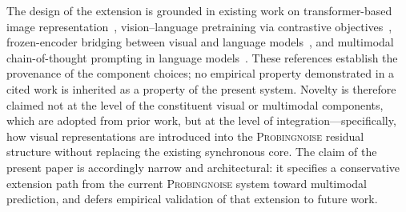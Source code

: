 The design of the extension is grounded in existing work on transformer-based image representation~\citep{dosovitskiy2021vit}, vision--language pretraining via contrastive objectives~\citep{radford2021clip}, frozen-encoder bridging between visual and language models~\citep{li2023blip2}, and multimodal chain-of-thought prompting in language models~\citep{zhang2023mcot}. These references establish the provenance of the component choices; no empirical property demonstrated in a cited work is inherited as a property of the present system. Novelty is therefore claimed not at the level of the constituent visual or multimodal components, which are adopted from prior work, but at the level of integration---specifically, how visual representations are introduced into the \textsc{Probingnoise} residual structure without replacing the existing synchronous core. The claim of the present paper is accordingly narrow and architectural: it specifies a conservative extension path from the current \textsc{Probingnoise} system toward multimodal prediction, and defers empirical validation of that extension to future work.
